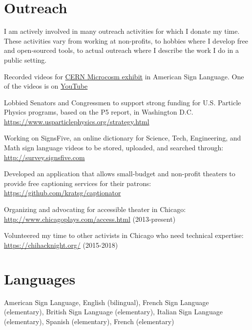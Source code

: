\documentclass[margin,line]{resume}
\let\origsection\section%
\let\section\subsection%
\let\section\origsection%
\begin{document}
\begin{resume}
\section{\mysidestyle Outreach}
I am actively involved in many outreach activities for which I donate my time. These activities vary from working at non-profits, to hobbies where I develop free and open-sourced tools, to actual outreach where I describe the work I do in a public setting.
\begin{list2}
\item Recorded videos for \href{https://microcosm.web.cern.ch/en}{CERN Microcosm exhibit} in American Sign Language. One of the videos is on \href{https://www.youtube.com/watch?v=BaGjAruqFec}{YouTube}
  \item Lobbied Senators and Congressmen to support strong funding for U.S. Particle Physics programs, based on the P5 report, in Washington D.C. \url{https://www.usparticlephysics.org/strategy.html}
  \item Working on SignsFive, an online dictionary for Science, Tech, Engineering, and Math sign language videos to be stored, uploaded, and searched through: \url{http://survey.signsfive.com}
  \item Developed an application that allows small-budget and non-profit theaters to provide free captioning services for their patrons: \url{https://github.com/kratsg/captionator}
  \item Organizing and advocating for accessible theater in Chicago: \url{http://www.chicagoplays.com/access.html} (2013-present)
  \item Volunteered my time to other activists in Chicago who need technical expertise: \url{https://chihacknight.org/} (2015-2018)
\end{list2}

\section{\mysidestyle Languages}

American Sign Language, English (bilingual), French Sign Language (elementary), British Sign Language (elementary), Italian Sign Language (elementary), Spanish (elementary), French (elementary)


\end{resume}
\end{document}
